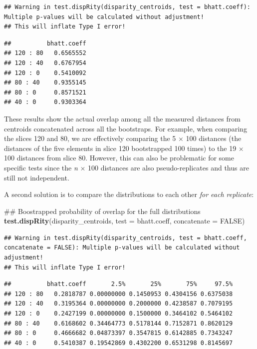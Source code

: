 \documentclass[]{book}
\newenvironment{Shaded}{\begin{snugshade}}{\end{snugshade}}
\newcommand{\KeywordTok}[1]{\textcolor[rgb]{0.13,0.29,0.53}{\textbf{#1}}}
\newcommand{\DataTypeTok}[1]{\textcolor[rgb]{0.13,0.29,0.53}{#1}}
\newcommand{\OtherTok}[1]{\textcolor[rgb]{0.56,0.35,0.01}{#1}}
\newcommand{\NormalTok}[1]{#1}
\theoremstyle{definition}
\theoremstyle{definition}
\theoremstyle{remark}
\begin{document}
\begin{verbatim}
## Warning in test.dispRity(disparity_centroids, test = bhatt.coeff): Multiple p-values will be calculated without adjustment!
## This will inflate Type I error!
\end{verbatim}

\begin{verbatim}
##          bhatt.coeff
## 120 : 80   0.6565552
## 120 : 40   0.6767954
## 120 : 0    0.5410092
## 80 : 40    0.9355145
## 80 : 0     0.8571521
## 40 : 0     0.9303364
\end{verbatim}

These results show the actual overlap among all the measured distances
from centroids concatenated across all the bootstraps. For example, when
comparing the slices 120 and 80, we are effectively comparing the 5
\(\times\) 100 distances (the distances of the five elements in slice
120 bootstrapped 100 times) to the 19 \(\times\) 100 distances from
slice 80. However, this can also be problematic for some specific tests
since the \emph{n} \(\times\) 100 distances are also pseudo-replicates
and thus are still not independent.

A second solution is to compare the distributions to each other
\emph{for each replicate}:

\begin{Shaded}
\begin{Highlighting}[]
\NormalTok{## Boostrapped probability of overlap for the full distributions}
\KeywordTok{test.dispRity}\NormalTok{(disparity_centroids, }\DataTypeTok{test =}\NormalTok{ bhatt.coeff, }\DataTypeTok{concatenate =} \OtherTok{FALSE}\NormalTok{)}
\end{Highlighting}
\end{Shaded}

\begin{verbatim}
## Warning in test.dispRity(disparity_centroids, test = bhatt.coeff, concatenate = FALSE): Multiple p-values will be calculated without adjustment!
## This will inflate Type I error!
\end{verbatim}

\begin{verbatim}
##          bhatt.coeff       2.5%       25%       75%     97.5%
## 120 : 80   0.2818787 0.00000000 0.1450953 0.4304156 0.6375038
## 120 : 40   0.3195364 0.00000000 0.2000000 0.4238587 0.7079195
## 120 : 0    0.2427199 0.00000000 0.1500000 0.3464102 0.5464102
## 80 : 40    0.6168602 0.34464773 0.5178144 0.7152871 0.8620129
## 80 : 0     0.4666682 0.04873397 0.3547815 0.6142885 0.7343247
## 40 : 0     0.5410387 0.19542869 0.4302200 0.6531298 0.8145697
\end{verbatim}
\end{document}
